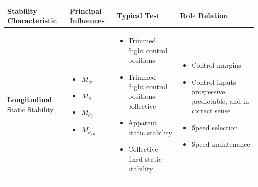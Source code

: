 \documentclass[
]{book}
\providecommand{\tightlist}{%
  \setlength{\itemsep}{0pt}\setlength{\parskip}{0pt}}
\begin{document}
\begin{longtable}[]{@{}llll@{}}
\toprule
\begin{minipage}[b]{0.16\columnwidth}\raggedright
\textbf{Stability Characteristic}\strut
\end{minipage} & \begin{minipage}[b]{0.14\columnwidth}\raggedright
\textbf{Principal Influences}\strut
\end{minipage} & \begin{minipage}[b]{0.27\columnwidth}\raggedright
\textbf{Typical Test}\strut
\end{minipage} & \begin{minipage}[b]{0.33\columnwidth}\raggedright
\textbf{Role Relation}\strut
\end{minipage}\tabularnewline
\midrule
\endhead
\begin{minipage}[t]{0.16\columnwidth}\raggedright
\textbf{Longitudinal}
Static Stability\strut
\end{minipage} & \begin{minipage}[t]{0.14\columnwidth}\raggedright
\begin{itemize}
\tightlist
\item
  \(M_w\)
\item
  \(M_u\)
\item
  \(M_{\theta_C}\)
\item
  \(M_{\theta_{TR}}\)
\end{itemize}\strut
\end{minipage} & \begin{minipage}[t]{0.27\columnwidth}\raggedright
\begin{itemize}
\tightlist
\item
  Trimmed flight control positions
\item
  Trimmed flight control positions - collective
\item
  Apparent static stability
\item
  Collective fixed static stability
\end{itemize}\strut
\end{minipage} & \begin{minipage}[t]{0.33\columnwidth}\raggedright
\begin{itemize}
\tightlist
\item
  Control margins
\item
  Control inputs progressive, predictable, and in correct sense
\item
  Speed selection
\item
  Speed maintenance

\end{itemize}
\end{minipage}
\end{longtable}
\end{document}
